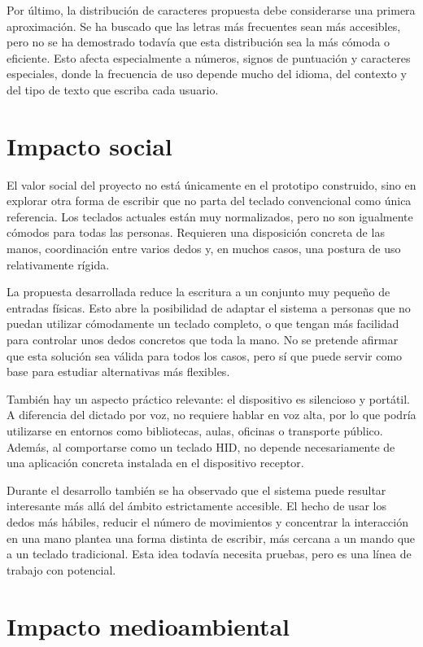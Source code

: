 Por último, la distribución de caracteres propuesta debe considerarse una primera aproximación. Se ha buscado que las letras más frecuentes sean más accesibles, pero no se ha demostrado todavía que esta distribución sea la más cómoda o eficiente. Esto afecta especialmente a números, signos de puntuación y caracteres especiales, donde la frecuencia de uso depende mucho del idioma, del contexto y del tipo de texto que escriba cada usuario.

\section{Impacto social}
\label{sec:impacto-social}

El valor social del proyecto no está únicamente en el prototipo construido, sino en explorar otra forma de escribir que no parta del teclado convencional como única referencia. Los teclados actuales están muy normalizados, pero no son igualmente cómodos para todas las personas. Requieren una disposición concreta de las manos, coordinación entre varios dedos y, en muchos casos, una postura de uso relativamente rígida.

La propuesta desarrollada reduce la escritura a un conjunto muy pequeño de entradas físicas. Esto abre la posibilidad de adaptar el sistema a personas que no puedan utilizar cómodamente un teclado completo, o que tengan más facilidad para controlar unos dedos concretos que toda la mano. No se pretende afirmar que esta solución sea válida para todos los casos, pero sí que puede servir como base para estudiar alternativas más flexibles.

También hay un aspecto práctico relevante: el dispositivo es silencioso y portátil. A diferencia del dictado por voz, no requiere hablar en voz alta, por lo que podría utilizarse en entornos como bibliotecas, aulas, oficinas o transporte público. Además, al comportarse como un teclado HID, no depende necesariamente de una aplicación concreta instalada en el dispositivo receptor.

Durante el desarrollo también se ha observado que el sistema puede resultar interesante más allá del ámbito estrictamente accesible. El hecho de usar los dedos más hábiles, reducir el número de movimientos y concentrar la interacción en una mano plantea una forma distinta de escribir, más cercana a un mando que a un teclado tradicional. Esta idea todavía necesita pruebas, pero es una línea de trabajo con potencial.

\section{Impacto medioambiental}
\label{sec:impacto-medioambiental}

